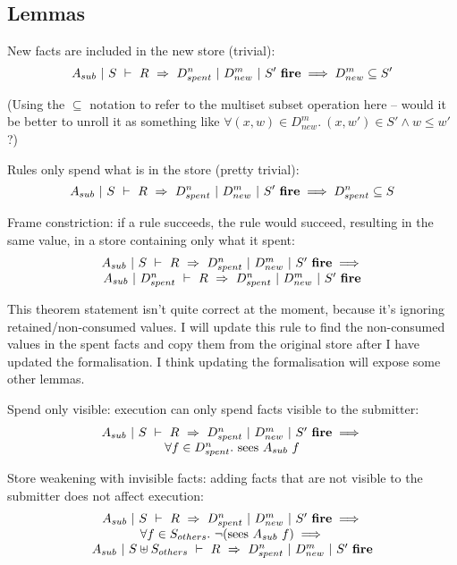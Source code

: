 \subsection{Lemmas}


\begin{lemma}
New facts are included in the new store (trivial):
$$
A_{sub}~|~S~\vdash~R~\Rightarrow~D_{spent}^n~|~D_{new}^m~|~S'~\textbf{fire}
\implies
D_{new}^m \subseteq S'
$$
\end{lemma}
(Using the $\subseteq$ notation to refer to the multiset subset operation here -- would it be better to unroll it as something like $\forall (x,w) \in D_{new}^m.\ (x,w') \in S' \wedge w \le w'$ ?)

\begin{lemma}
Rules only spend what is in the store (pretty trivial):
$$
A_{sub}~|~S~\vdash~R~\Rightarrow~D_{spent}^n~|~D_{new}^m~|~S'~\textbf{fire}
\implies
D_{spent}^n \subseteq S
$$
\end{lemma}

\begin{theorem}
Frame constriction: if a rule succeeds, the rule would succeed, resulting in the same value, in a store containing only what it spent:
$$
\begin{array}{c}
A_{sub}~|~S~\vdash~R~\Rightarrow~D_{spent}^n~|~D_{new}^m~|~S'~\textbf{fire}
\implies \\
A_{sub}~|~D_{spent}^n~\vdash~R~\Rightarrow~D_{spent}^n~|~D_{new}^m~|~S'~\textbf{fire}
\end{array}
$$
\end{theorem}
This theorem statement isn't quite correct at the moment, because it's ignoring retained/non-consumed values. I will update this rule to find the non-consumed values in the spent facts and copy them from the original store after I have updated the formalisation. I think updating the formalisation will expose some other lemmas.

\begin{theorem}
Spend only visible: execution can only spend facts visible to the submitter:
$$
\begin{array}{c}
A_{sub}~|~S~\vdash~R~\Rightarrow~D_{spent}^n~|~D_{new}^m~|~S'~\textbf{fire}
\implies \\
\forall f \in D_{spent}^n.\ \textrm{sees}~ A_{sub}~ f
\end{array}
$$
\end{theorem}

\begin{theorem}
Store weakening with invisible facts: adding facts that are not visible to the submitter does not affect execution:
$$
\begin{array}{c}
A_{sub}~|~S~\vdash~R~\Rightarrow~D_{spent}^n~|~D_{new}^m~|~S'~\textbf{fire}
\implies \\
\forall f \in S_{others}.\ \neg (\textrm{sees}~ A_{sub}~ f)
\implies \\
A_{sub}~|~S \uplus S_{others}~\vdash~R~\Rightarrow~D_{spent}^n~|~D_{new}^m~|~S'~\textbf{fire}
\end{array}
$$
\end{theorem}

